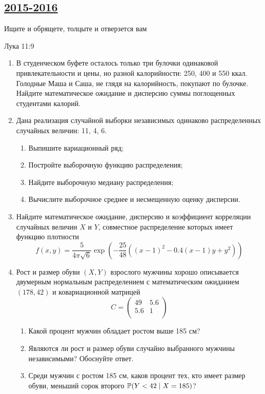 \newpage
\subsection[2015-2016]{\hyperref[sec:sol_kr_03_2015_2016]{2015-2016}}
\label{sec:kr_03_2015_2016}

\epigraph{Ищите и обрящете, толцыте и отверзется вам}{Лука 11:9}

\begin{enumerate}
\item В студенческом буфете осталось только три булочки одинаковой привлекательности
и цены, но разной калорийности: 250, 400 и 550 ккал. Голодные Маша и Саша, не глядя
на калорийность, покупают по булочке. Найдите математическое ожидание и дисперсию
суммы поглощенных студентами калорий.
\item Дана реализация случайной выборки  независимых одинаково распределенных
случайных величин: 11, 4, 6.
\begin{enumerate}
  \item Выпишите вариационный ряд;
  \item Постройте выборочную функцию распределения;
  \item Найдите выборочную медиану распределения;
  \item Вычислите выборочное среднее и несмещенную оценку дисперсии.
\end{enumerate}

\item Найдите математическое ожидание, дисперсию и коэффициент корреляции случайных
величин $X$ и $Y$, совместное распределение которых имеет функцию плотности
\[
f(x, y) = \frac{5}{4\pi \sqrt{6}} \exp\left(
-\frac{25}{48}\left( (x-1)^2 -0.4(x-1)y + y^2 \right)
\right)
\]

\item Рост и размер обуви $(X, Y)$ взрослого мужчины хорошо описывается двумерным
нормальным распределением с математическим ожиданием $(178, 42)$ и ковариационной
матрицей
\[
C = \begin{pmatrix}
49 & 5.6 \\
5.6 & 1 \\
\end{pmatrix}
\]
\begin{enumerate}
  \item Какой процент мужчин обладает ростом выше 185 см?
  \item Являются ли рост и размер обуви случайно выбранного мужчины независимыми?
	Обоснуйте ответ.
  \item Среди мужчин с ростом 185 см, каков процент тех, кто имеет размер обуви,
	меньший сорок второго  $\P(Y < 42 \mid X=185)$?
\end{enumerate}



\end{enumerate}
